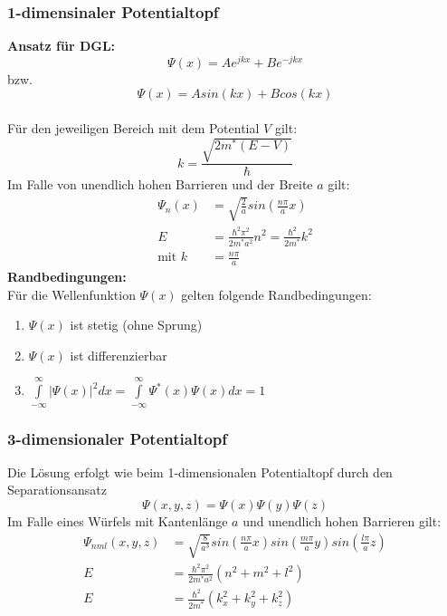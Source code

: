 \documentclass[a4paper,twocolumn,10pt]{article}
\begin{document}
\subsubsection{1-dimensinaler Potentialtopf}
\textbf{Ansatz für DGL:}
\begin{equation*}
\Psi(x)=Ae^{jkx}+Be^{-jkx}
\end{equation*}
bzw.
\begin{equation*}
\Psi(x)=Asin(kx)+Bcos(kx)
\end{equation*}\\
Für den jeweiligen Bereich mit dem Potential $V$ gilt:
\begin{equation*}
k=\frac{\sqrt{2m^*(E-V)}}{\hbar}
\end{equation*}
Im Falle von unendlich hohen Barrieren und der Breite $a$ gilt:
\begin{equation*}
\begin{split}
\Psi_n(x)&=\sqrt{\frac{2}{a}}sin\left(\frac{n\pi}{a}x\right) \\
E&=\frac{\hbar^2\pi^2}{2m^*a^2}n^2=\frac{\hbar^2}{2m^*}k^2 \\
\text{mit }k&=\frac{n\pi}{a}
\end{split}
\end{equation*}
\textbf{Randbedingungen:}\\
Für die Wellenfunktion $\Psi(x)$ gelten folgende Randbedingungen:
\begin{enumerate}[label=$\bullet$]
\item $\Psi(x)$ ist stetig (ohne Sprung)
\item $\Psi(x)$ ist differenzierbar
\item $\int\limits_{-\infty}^{\infty}|\Psi(x)|^2dx=\int\limits_{-\infty}^{\infty}\Psi^*(x)\Psi(x)dx=1$
\end{enumerate}

\subsubsection{3-dimensionaler Potentialtopf}
Die Lösung erfolgt wie beim 1-dimensionalen Potentialtopf durch den Separationsansatz
\begin{equation*}
\Psi(x,y,z)=\Psi(x)\Psi(y)\Psi(z)
\end{equation*}
Im Falle eines Würfels mit Kantenlänge $a$ und unendlich hohen Barrieren gilt:
\begin{equation*}
\begin{split}
\Psi_{nml}(x,y,z)&=\sqrt{\frac{8}{a^3}}sin\left(\frac{n\pi}{a}x\right)sin\left(\frac{m\pi}{a}y\right)sin\left(\frac{l\pi}{a}z\right)\\
E&=\frac{\hbar^2\pi^2}{2m^*a^2}(n^2+m^2+l^2) \\
E&=\frac{\hbar^2}{2m^*}(k_x^2+k_y^2+k_z^2)
\end{split}
\end{equation*}
\end{document}
